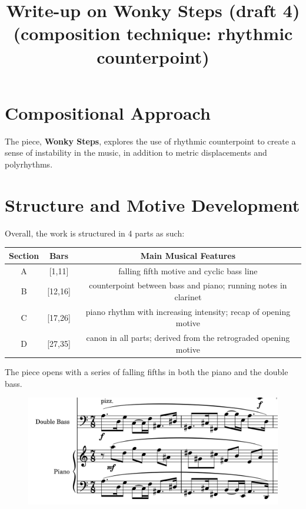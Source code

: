 \documentclass[a4paper]{article}
\title{Write-up on {\bf Wonky Steps} (draft 4)\\
(composition technique: rhythmic counterpoint)}
\author{}
\date{}
\begin{document}
\maketitle

\section{Compositional Approach}
The piece, {\bf Wonky Steps}, explores the use of rhythmic counterpoint to create a sense of instability in the music, in addition to metric displacements and polyrhythms.

\section{Structure and Motive Development}
Overall, the work is structured in 4 parts as such:

\begin{center}
	\def\arraystretch{1.5}
\begin{tabular}{|c|c|c|}
	\hline
	Section&Bars&Main Musical Features\\
	\hline
	A&[1,11]&falling fifth motive and cyclic bass line\\
	\hline
	B&[12,16]&counterpoint between bass and piano; running notes in clarinet\\
	\hline
	C&[17,26]&piano rhythm with increasing intensity; recap of opening motive\\
	\hline
	D&[27,35]&canon in all parts; derived from the retrograded opening motive\\
	\hline
\end{tabular}
\end{center}

The piece opens with a series of falling fifths in both the piano and the double bass. 

\begin{figure}[h]
\includegraphics[]{wonkfifths.png}
\end{figure}
\end{document}
